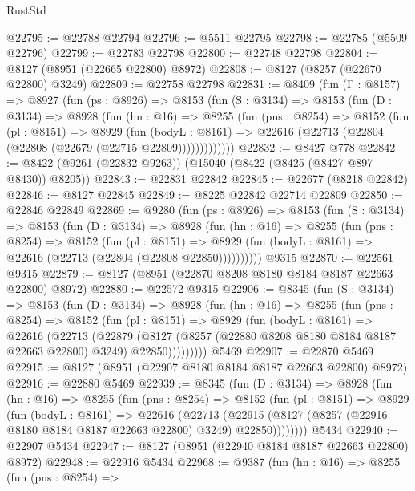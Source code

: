 \begin{lexlean}{RustStd}
\begin{coremodule}
@22795 := @22788 @22794
@22796 := @5511 @22795
@22798 := @22785 (@5509 @22796)
@22799 := @22783 @22798
@22800 := @22748 @22798
@22804 := @8127 (@8951 (@22665 @22800) @8972)
@22808 := @8127 (@8257 (@22670 @22800) @3249)
@22809 := @22758 @22798
@22831 := @8409
    (fun (Γ : @8157) =>
    @8927
      (fun (ps : @8926) =>
      @8153
        (fun (S : @3134) =>
        @8153
          (fun (D : @3134) =>
          @8928
            (fun (hn : @16) =>
            @8255
              (fun (pns : @8254) =>
              @8152
                (fun (pl : @8151) =>
                @8929
                  (fun (bodyL : @8161) =>
                  @22616 (@22713 (@22804 (@22808 (@22679 (@22715 @22809)))))))))))))
@22832 := @8427 @778
@22842 := @8422 (@9261 (@22832 @9263)) (@15040 (@8422 (@8425 (@8427 @897 @8430)) @8205))
@22843 := @22831 @22842
@22845 := @22677 (@8218 @22842)
@22846 := @8127 @22845
@22849 := @8225 @22842 @22714 @22809
@22850 := @22846 @22849
@22869 := @9280
    (fun (ps : @8926) =>
    @8153
      (fun (S : @3134) =>
      @8153
        (fun (D : @3134) =>
        @8928
          (fun (hn : @16) =>
          @8255
            (fun (pns : @8254) =>
            @8152
              (fun (pl : @8151) =>
              @8929 (fun (bodyL : @8161) => @22616 (@22713 (@22804 (@22808 @22850))))))))))
    @9315
@22870 := @22561 @9315
@22879 := @8127 (@8951 (@22870 @8208 @8180 @8184 @8187 @22663 @22800) @8972)
@22880 := @22572 @9315
@22906 := @8345
    (fun (S : @3134) =>
    @8153
      (fun (D : @3134) =>
      @8928
        (fun (hn : @16) =>
        @8255
          (fun (pns : @8254) =>
          @8152
            (fun (pl : @8151) =>
            @8929
              (fun (bodyL : @8161) =>
              @22616
                (@22713
                  (@22879
                    (@8127
                      (@8257 (@22880 @8208 @8180 @8184 @8187 @22663 @22800) @3249)
                      @22850)))))))))
    @5469
@22907 := @22870 @5469
@22915 := @8127 (@8951 (@22907 @8180 @8184 @8187 @22663 @22800) @8972)
@22916 := @22880 @5469
@22939 := @8345
    (fun (D : @3134) =>
    @8928
      (fun (hn : @16) =>
      @8255
        (fun (pns : @8254) =>
        @8152
          (fun (pl : @8151) =>
          @8929
            (fun (bodyL : @8161) =>
            @22616
              (@22713
                (@22915 (@8127 (@8257 (@22916 @8180 @8184 @8187 @22663 @22800) @3249) @22850))))))))
    @5434
@22940 := @22907 @5434
@22947 := @8127 (@8951 (@22940 @8184 @8187 @22663 @22800) @8972)
@22948 := @22916 @5434
@22968 := @9387
    (fun (hn : @16) =>
    @8255
      (fun (pns : @8254) =>

\end{coremodule}
\end{lexlean}
